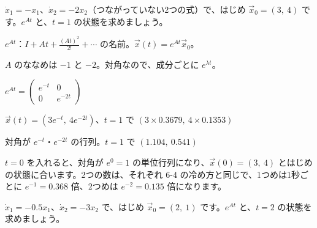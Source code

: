 \begin{reidai}[対角の行列]
$\dot x_1=-x_1$、$\dot x_2=-2x_2$（つながっていない2つの式）で、はじめ $\vec x_0=(3,\ 4)$ です。$e^{At}$ と、$t=1$ の状態を求めましょう。\par
\kangaekata {}\par
{}\enspace $e^{At}$：$I+At+\frac{(At)^2}{2!}+\cdots$ の名前。$\vec x(t)=e^{At}\vec x_0$。\par
{}\enspace $A$ のななめは $-1$ と $-2$。対角なので、成分ごとに $e^{\lambda t}$。\par
\shiki\kixls{}\zw{} $e^{At}=\begin{pmatrix}e^{-t}&0\\0&e^{-2t}\end{pmatrix}$\par
\kixla $\vec x(t)=(3e^{-t},\ 4e^{-2t})$、$t=1$ で $(3\times0.3679,\ 4\times0.1353)$\par
\kotae 対角が $e^{-t}$・$e^{-2t}$ の行列。$t=1$ で $(1.104,\ 0.541)$
\end{reidai}

$t=0$ を入れると、対角が $e^0=1$ の単位行列になり、$\vec x(0)=(3,\ 4)$ とはじめの状態に合います。2つの数は、それぞれ 6-4 の冷め方と同じで、1つめは1秒ごとに $e^{-1}=0.368$ 倍、2つめは $e^{-2}=0.135$ 倍になります。

\begin{jibun}
$\dot x_1=-0.5x_1$、$\dot x_2=-3x_2$ で、はじめ $\vec x_0=(2,\ 1)$ です。$e^{At}$ と、$t=2$ の状態を求めましょう。
\end{jibun}

